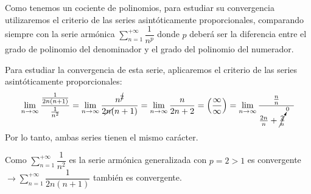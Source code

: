 \documentclass[12pt]{article}
\newcommand{\tozero}[1]{\cancelto{0}{#1}~~~}
\begin{document}
\begin{enumerate}[label=\color{red}\textbf{\arabic*}),leftmargin=*, start=27]
Como tenemos un cociente de polinomios, para estudiar su convergencia utilizaremos el criterio de las series asintóticamente proporcionales, comparando siempre con la serie armónica $\sum_{n=1}^{+\infty}\dfrac{1}{n^p}$ donde $p$ deberá ser la diferencia entre el grado de polinomio del denominador y el grado del polinomio del numerador.

\begin{minipage}[h]{\linewidth}

\begin{figure}
\end{figure}

Para estudiar la convergencia de esta serie, aplicaremos el criterio de las series asintóticamente proporcionales: \[ \lim_{n\to\infty}\dfrac{\frac{1}{2n(n+1)}}{\frac{1}{n^2}}=\lim_{n\to\infty}\dfrac{n^{\cancel{2}}}{2\cancel{n}(n+1)}=\lim_{n\to\infty}\dfrac{n}{2n+2}=\left(\dfrac{\infty}{\infty}\right)=\lim_{n\to\infty}\dfrac{\frac{n}{n}}{\frac{2n}{n}+\tozero{\frac{2}{n}}} \]
Por lo tanto, ambas series tienen el mismo carácter.
\end{minipage}


\begin{minipage}{\linewidth}
\begin{figure}
\end{figure}

Como $\sum_{n=1}^{+\infty}\dfrac{1}{n^2}$ es la serie armónica generalizada con $p=2>1$ es convergente $\longrightarrow\sum_{n=1}^{+\infty}\dfrac{1}{2n(n+1)}$ también es convergente.
\end{minipage}


\end{enumerate}
\end{document}
